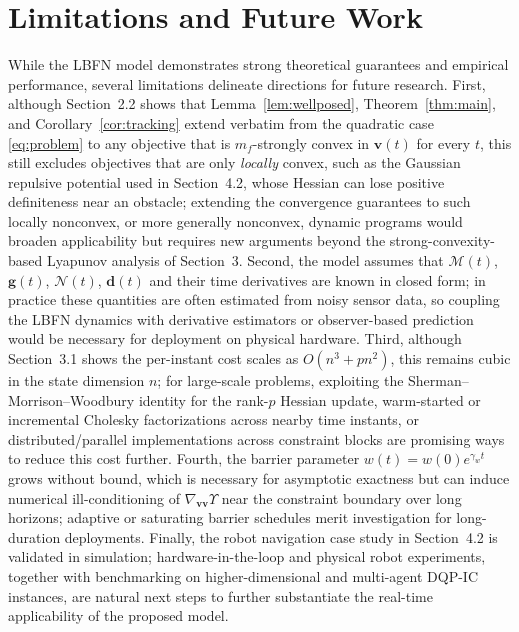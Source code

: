 \documentclass[fleqn,10pt]{wlscirep}
\begin{document}
\section{Limitations and Future Work}\label{sec:limitations}
While the LBFN model demonstrates strong theoretical guarantees and empirical performance, several limitations delineate directions for future research. First, although Section~2.2 shows that Lemma~\ref{lem:wellposed}, Theorem~\ref{thm:main}, and Corollary~\ref{cor:tracking} extend verbatim from the quadratic case \eqref{eq:problem} to any objective that is $m_f$-strongly convex in $\bm{v}(t)$ for every $t$, this still excludes objectives that are only \emph{locally} convex, such as the Gaussian repulsive potential used in Section~4.2, whose Hessian can lose positive definiteness near an obstacle; extending the convergence guarantees to such locally nonconvex, or more generally nonconvex, dynamic programs would broaden applicability but requires new arguments beyond the strong-convexity-based Lyapunov analysis of Section~3. Second, the model assumes that $\mathcal{M}(t)$, $\bm{g}(t)$, $\mathcal{N}(t)$, $\bm{d}(t)$ and their time derivatives are known in closed form; in practice these quantities are often estimated from noisy sensor data, so coupling the LBFN dynamics with derivative estimators or observer-based prediction would be necessary for deployment on physical hardware. Third, although Section~3.1 shows the per-instant cost scales as $O(n^3+pn^2)$, this remains cubic in the state dimension $n$; for large-scale problems, exploiting the Sherman--Morrison--Woodbury identity for the rank-$p$ Hessian update, warm-started or incremental Cholesky factorizations across nearby time instants, or distributed/parallel implementations across constraint blocks are promising ways to reduce this cost further. Fourth, the barrier parameter $w(t)=w(0)e^{\gamma_w t}$ grows without bound, which is necessary for asymptotic exactness but can induce numerical ill-conditioning of $\nabla_{\bm{vv}}\Upsilon$ near the constraint boundary over long horizons; adaptive or saturating barrier schedules merit investigation for long-duration deployments. Finally, the robot navigation case study in Section~4.2 is validated in simulation; hardware-in-the-loop and physical robot experiments, together with benchmarking on higher-dimensional and multi-agent DQP-IC instances, are natural next steps to further substantiate the real-time applicability of the proposed model.
\end{document}
